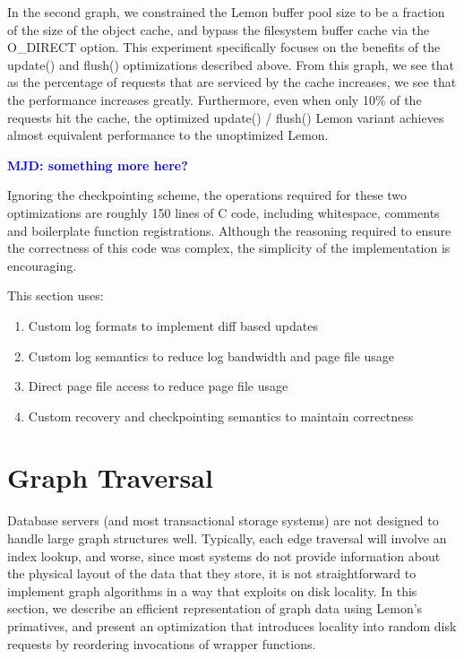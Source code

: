 \documentclass[letterpaper,twocolumn,english]{article}
\newcommand{\yad}{Lemon\xspace}
\newcommand{\mjd}[1]{\textcolor{blue}{\bf MJD: #1}}
\begin{document}
In the second graph, we constrained the \yad buffer pool size to be a
fraction of the size of the object cache, and bypass the filesystem
buffer cache via the O\_DIRECT option. This experiment specifically
focuses on the benefits of the update() and flush() optimizations
described above. From this graph, we see that as the percentage of
requests that are serviced by the cache increases, we see that the
performance increases greatly. Furthermore, even when only 10\% of the
requests hit the cache, the optimized update() / flush() \yad variant
achieves almost equivalent performance to the unoptimized \yad.

\mjd{something more here?}

Ignoring the checkpointing scheme, the operations required for these
two optimizations are roughly 150 lines of C code, including
whitespace, comments and boilerplate function registrations.  Although
the reasoning required to ensure the correctness of this code was
complex, the simplicity of the implementation is encouraging.

This section uses:

\begin{enumerate}
\item{Custom log formats to implement diff based updates}
\item{Custom log semantics to reduce log bandwidth and page file usage}
\item{Direct page file access to reduce page file usage}
\item{Custom recovery and checkpointing semantics to maintain correctness}
\end{enumerate}

\section{Graph Traversal\label{TransClos}}

Database servers (and most transactional storage systems) are not
designed to handle large graph structures well.  Typically, each edge
traversal will involve an index lookup, and worse, since most systems
do not provide information about the physical layout of the data that
they store, it is not straightforward to implement graph algorithms in
a way that exploits on disk locality.  In this section, we describe an
efficient representation of graph data using \yad's primatives, and
present an optimization that introduces locality into random disk
requests by reordering invocations of wrapper functions.
\end{document}

